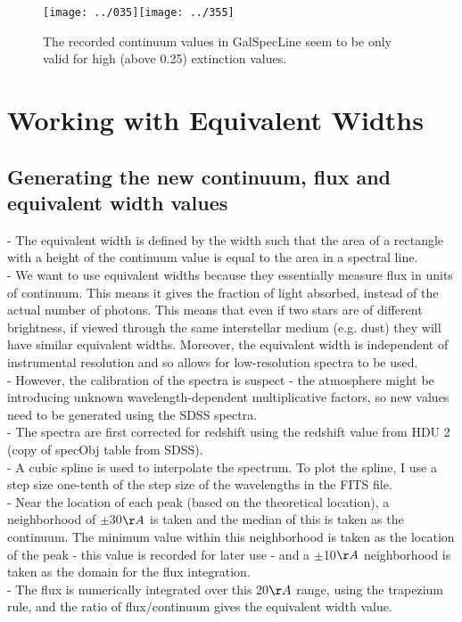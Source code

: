 \documentclass[12pt]{article}
\begin{document}
\begin{figure}
\texttt{[image: ../035]}\texttt{[image: ../355]}\\
\caption{The recorded continuum values in GalSpecLine seem to be only valid for high (above 0.25) extinction values.}
\end{figure}
\section{Working with Equivalent Widths}
\subsection{Generating the new continuum, flux and equivalent width values}
- The equivalent width is defined by the width such that the area of a rectangle with a height of the continuum value is equal to the area in a spectral line.\\
- We want to use equivalent widths because they essentially measure flux in units of continuum. This means it gives the fraction of light absorbed, instead of the actual number of photons. This means that even if two stars are of different brightness, if viewed through the same interstellar medium (e.g. dust) they will have similar equivalent widths. Moreover, the equivalent width is independent of instrumental resolution and so allows for low-resolution spectra to be used.\\
- However, the calibration of the spectra is suspect - the atmosphere might be introducing unknown wavelength-dependent multiplicative factors, so new values need to be generated using the SDSS spectra.\\
- The spectra are first corrected for redshift using the redshift value from HDU 2 (copy of specObj table from SDSS).\\
- A cubic spline is used to interpolate the spectrum. To plot the spline, I use a step size one-tenth of the step size of the wavelengths in the FITS file. \\
- Near the location of each peak (based on the theoretical location), a neighborhood of $\pm$30$\AA$ is taken and the median of this is taken as the continuum. The minimum value within this neighborhood is taken as the location of the peak - this value is recorded for later use - and a $\pm$10$\AA$ neighborhood is taken as the domain for the flux integration.\\
- The flux is numerically integrated over this 20$\AA$ range, using the trapezium rule, and the ratio of flux/continuum gives the equivalent width value.\\
\end{document}
